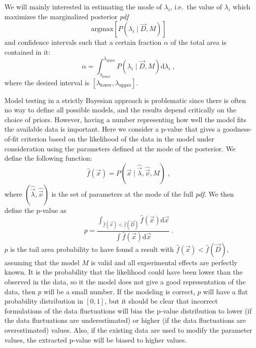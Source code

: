 We will mainly interested in estimating the mode of $\lambda_i$, i.e.~the value of $\lambda_i$ which maximizes the marginalized posterior \emph{pdf}
\begin{equation}\text{argmax}\left[ P(\lambda_i\mid\vec{D},M) \right]\end{equation}
and confidence intervals such that a certain fraction $\alpha$ of the total area is contained in it:
\begin{equation}\alpha=\int^{\lambda_\text{upper}}_{\lambda_\text{lower}}P(\lambda_i\mid\vec{D},M)\text{d}\lambda_i\;,\end{equation}
where the desired interval is $[\lambda_\text{lower},\lambda_\text{upper}]$.

 Model testing in a strictly Bayesian approach is problematic since there is often no way to define all possible models, and the results depend critically on the choice of priors. However, having a number representing how well the model fits the available data is important. Here we consider a p-value that gives a goodness-of-fit criterion based on the likelihood of the data in the model under consideration using the parameters defined at the mode of the posterior. We define the following function:
\begin{equation}\hat{f}(\vec{x})=P(\vec{x}\mid\hat{\vec{\lambda}},\hat{\vec{\nu}},M)\;,\end{equation}
where $(\hat{\vec{\lambda}},\hat{\vec{\nu}})$ is the set of parameters at the mode of the full \emph{pdf}. We then define the p-value as
\begin{equation}p=\frac{\int_{\hat{f}(\vec{x})<\hat{f}(\vec{D})}\hat{f}(\vec{x})\text{d}\vec{x}}{\int \hat{f}(\vec{x})\text{d}\vec{x}}\;.\label{eq:pvalue}\end{equation}
$p$ is the tail area probability to have found a result with $\hat{f}(\vec{x})<\hat{f}(\vec{D})$, assuming that the model $M$ is valid and all experimental effects are perfectly known. It is the probability that the likelihood could have been lower than the observed in the data, so it the model does not give a good representation of the data, then $p$ will be a small number. If the modeling is correct, $p$ will have a flat probability distribution in $[0,1]$, but it should be clear that incorrect formulations of the data fluctuations will bias the p-value distribution to lower (if the data fluctuations are underestimated) or higher (if the data fluctuations are overestimated) values. Also, if the existing data are used to modify the parameter values, the extracted p-value will be biased to higher values.

